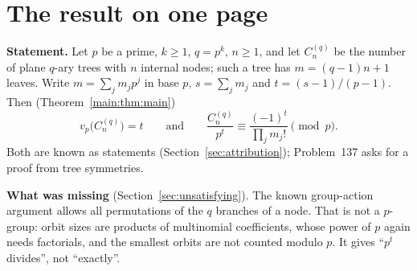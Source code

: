 \documentclass[11pt]{article}
\theoremstyle{definition}
\theoremstyle{remark}
\numberwithin{equation}{section}
\numberwithin{figure}{section}
\begin{document}
\clearpage
\section*{The result on one page}\label{sec:onepage}

\noindent\textbf{Statement.} Let $p$ be a prime, $k\ge1$, $q=p^k$, $n\ge1$, and let $C_n^{(q)}$ be the number
of plane $q$-ary trees with $n$ internal nodes; such a tree has $m=(q-1)n+1$ leaves. Write $m=\sum_jm_jp^j$
in base $p$, $s=\sum_jm_j$ and $t=(s-1)/(p-1)$. Then (Theorem~\ref{main:thm:main})
\[
 v_p\bigl(C_n^{(q)}\bigr)=t\qquad\text{and}\qquad\frac{C_n^{(q)}}{p^t}\equiv\frac{(-1)^t}{\prod_jm_j!}\pmod p .
\]
Both are known as statements (Section~\ref{sec:attribution}); Problem~137 asks for a proof from tree symmetries.

\noindent\textbf{What was missing} (Section~\ref{sec:unsatisfying}). The known group-action argument
\cite{Konvalinka} allows all permutations of the $q$ branches of a node. That is not a $p$-group: orbit sizes
are products of multinomial coefficients, whose power of $p$ again needs factorials, and the smallest orbits
are not counted modulo $p$. It gives ``$p^t$ divides'', not ``exactly''.
\end{document}
